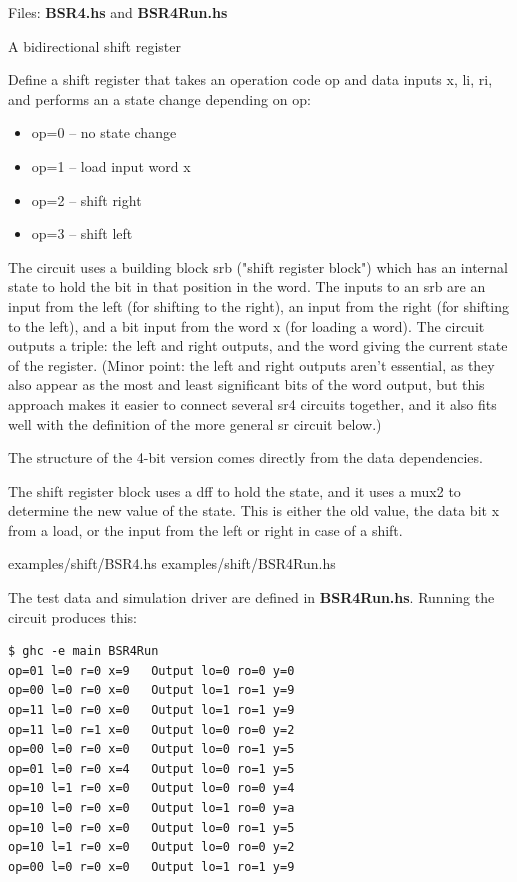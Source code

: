 \documentclass[]{svmono}
\begin{document}
Files: \textbf{BSR4.hs} and \textbf{BSR4Run.hs}

A bidirectional shift register

Define a shift register that takes an operation code op and data
inputs x, li, ri, and performs an a state change depending on op:

\begin{itemize}
\item op=0 -- no state change
\item op=1 -- load input word x
\item op=2 -- shift right
\item op=3 -- shift left
\end{itemize}

The circuit uses a building block srb ("shift register block") which
has an internal state to hold the bit in that position in the word.
The inputs to an srb are an input from the left (for shifting to the
right), an input from the right (for shifting to the left), and a bit
input from the word x (for loading a word).  The circuit outputs a
triple: the left and right outputs, and the word giving the current
state of the register.  (Minor point: the left and right outputs
aren't essential, as they also appear as the most and least
significant bits of the word output, but this approach makes it easier
to connect several sr4 circuits together, and it also fits well with
the definition of the more general sr circuit below.)

The structure of the 4-bit version comes directly from the data
dependencies.

The shift register block uses a dff to hold the state, and it uses a
mux2 to determine the new value of the state.  This is either the old
value, the data bit x from a load, or the input from the left or right
in case of a shift.

examples/shift/BSR4.hs
examples/shift/BSR4Run.hs

The test data and simulation driver are defined in \textbf{BSR4Run.hs}.
Running the circuit produces this:


\begin{verbatim}
$ ghc -e main BSR4Run
op=01 l=0 r=0 x=9   Output lo=0 ro=0 y=0
op=00 l=0 r=0 x=0   Output lo=1 ro=1 y=9
op=11 l=0 r=0 x=0   Output lo=1 ro=1 y=9
op=11 l=0 r=1 x=0   Output lo=0 ro=0 y=2
op=00 l=0 r=0 x=0   Output lo=0 ro=1 y=5
op=01 l=0 r=0 x=4   Output lo=0 ro=1 y=5
op=10 l=1 r=0 x=0   Output lo=0 ro=0 y=4
op=10 l=0 r=0 x=0   Output lo=1 ro=0 y=a
op=10 l=0 r=0 x=0   Output lo=0 ro=1 y=5
op=10 l=1 r=0 x=0   Output lo=0 ro=0 y=2
op=00 l=0 r=0 x=0   Output lo=1 ro=1 y=9
\end{verbatim}
\end{document}
